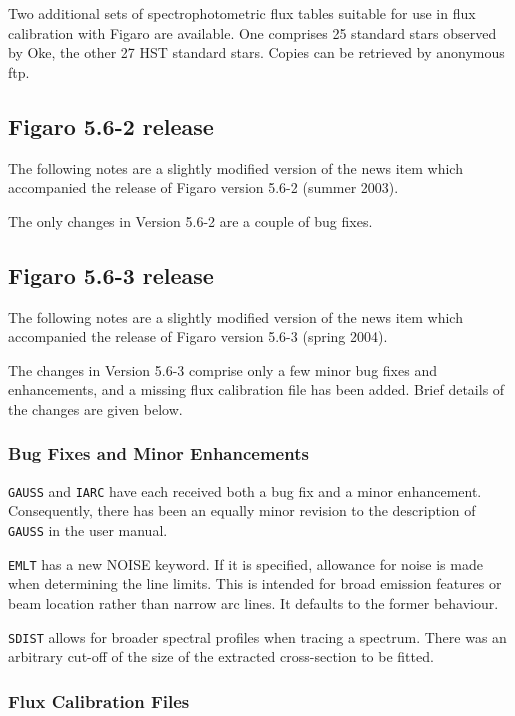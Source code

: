 \documentclass[11pt,twoside]{article}
\begin{document}
 Two additional sets of spectrophotometric flux tables suitable for use
 in flux calibration with Figaro are available.  One comprises 25 standard
 stars observed by Oke, the other 27 HST standard stars.  Copies can be
 retrieved by anonymous ftp.

\subsection{\label{news562}Figaro 5.6-2 release}

 The following notes are a slightly modified version of the news item
 which accompanied the release of Figaro version 5.6-2 (summer 2003).

 The only changes in Version 5.6-2 are a couple of bug fixes.

\subsection{\label{news563}Figaro 5.6-3 release}

 The following notes are a slightly modified version of the news item
 which accompanied the release of Figaro version 5.6-3 (spring 2004).

 The changes in Version 5.6-3 comprise only a few minor bug fixes
 and enhancements, and a missing flux calibration file has been added.
 Brief details of the changes are given below.

\subsubsection{Bug Fixes and Minor Enhancements}

 {\tt GAUSS} and {\tt IARC} have each received both a bug fix and a minor
 enhancement.  Consequently, there has been an equally minor revision to
 the description of {\tt GAUSS} in the user manual.

 {\tt EMLT} has a new NOISE keyword.  If it is specified, allowance for
 noise is made when determining the line limits.  This is intended for
 broad emission features or beam location rather than narrow arc lines.
 It defaults to the former behaviour.

 {\tt SDIST} allows for broader spectral profiles when tracing a
 spectrum.  There was an arbitrary cut-off of the size of the
 extracted cross-section to be fitted.

\subsubsection{Flux Calibration Files}
\end{document}
